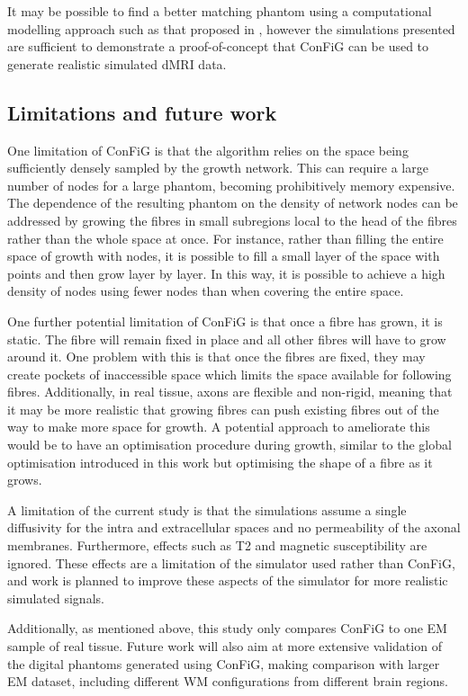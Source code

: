  It may be possible to find a better matching phantom using a computational modelling approach such as that proposed in \cite{Nedjati-Gilani2017}, however the simulations presented are sufficient to demonstrate a proof-of-concept that \ac{ConFiG} can be used to generate realistic simulated \ac{dMRI} data.

\subsection*{Limitations and future work}
\label{sec:config_limitations_future}
One limitation of \ac{ConFiG} is that the algorithm relies on the space being sufficiently densely sampled by the growth network. This can require a large number of nodes for a large phantom, becoming prohibitively memory expensive. The dependence of the resulting phantom on the density of network nodes can be addressed by growing the fibres in small subregions local to the head of the fibres rather than the whole space at once. For instance, rather than filling the entire space of growth with nodes, it is possible to fill a small layer of the space with points and then grow layer by layer. In this way, it is possible to achieve a high density of nodes using fewer nodes than when covering the entire space.

One further potential limitation of \ac{ConFiG} is that once a fibre has grown, it is static. The fibre will remain fixed in place and all other fibres will have to grow around it. One problem with this is that once the fibres are fixed, they may create pockets of inaccessible space which limits the space available for following fibres. Additionally, in real tissue, axons are flexible and non-rigid, meaning that it may be more realistic that growing fibres can push existing fibres out of the way to make more space for growth. A potential approach to ameliorate this would be to have an optimisation procedure during growth, similar to the global optimisation introduced in this work but optimising the shape of a fibre as it grows.

A limitation of the current study is that the simulations assume a single diffusivity for the intra and extracellular spaces and no permeability of the axonal membranes. Furthermore, effects such as T2 and magnetic susceptibility are ignored. These effects are a limitation of the simulator used rather than \ac{ConFiG}, and work is planned to improve these aspects of the simulator for more realistic simulated signals.

Additionally, as mentioned above, this study only compares \ac{ConFiG} to one EM sample of real tissue. Future work will also aim at more extensive validation of the digital phantoms generated using \ac{ConFiG}, making comparison with larger EM dataset, including different \ac{WM} configurations from different brain regions.

